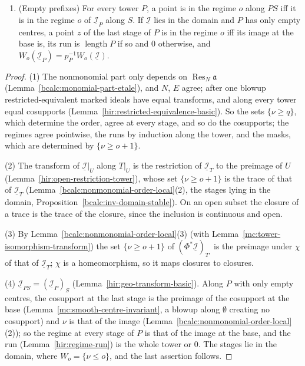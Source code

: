 \begin{lemma}
\begin{enumerate}
biholomorphism \(\Phi\) (Definition~\ref{hir:tower-isomorphism}). Then \(p\in W_o((\Phi^*\underline{\mathcal I})_{T'})\) iff \(\chi(p)\in W_o(\underline{\mathcal I}_T)\).
\item (Empty prefixes) For every tower \(P\), a point is in the regime \(o\) along \(PS\) iff it is in the regime \(o\) of \(\underline{\mathcal I}_P\) along \(S\). If
\(\underline{\mathcal I}\) lies in the domain and \(P\) has only empty centres, a point \(z\) of the last stage of \(P\) is in the regime \(o\) iff its image at the base is,
its run is \(\operatorname{length}P\) if so and \(0\) otherwise, and \(W_o(\underline{\mathcal I}_P)=p_P^{-1}W_o(\underline{\mathcal I})\).
\end{enumerate}
\end{lemma}
\begin{proof}
\leanok
(1) The nonmonomial part only depends on \(\operatorname{Res}_N\mathfrak a\) (Lemma~\ref{bcalc:monomial-part-etale}), and \(N\), \(E\) agree; after one blowup restricted-equivalent
marked ideals have equal transforms, and along every tower equal cosupports (Lemma~\ref{hir:restricted-equivalence-basic}). So the sets \(\{\nu\ge q\}\), which
determine the order, agree at every stage, and so do the cosupports; the regimes agree pointwise, the runs by induction along the tower, and the masks, which
are determined by \(\{\nu\ge o+1\}\).

(2) The transform of \(\underline{\mathcal I}|_U\) along \(T|_U\) is the restriction of \(\underline{\mathcal I}_T\) to the preimage of \(U\) (Lemma~\ref{hir:open-restriction-tower}),
whose set \(\{\nu\ge o+1\}\) is the trace of that of \(\underline{\mathcal I}_T\) (Lemma~\ref{bcalc:nonmonomial-order-local}(2), the stages lying in the domain,
Proposition~\ref{bcalc:inv-domain-stable}). On an open subset the closure of a trace is the trace of the closure, since the inclusion is continuous and open.

(3) By Lemma~\ref{bcalc:nonmonomial-order-local}(3) (with Lemma~\ref{mc:tower-isomorphism-transform}) the set \(\{\nu\ge o+1\}\) of \((\Phi^*\underline{\mathcal I})_{T'}\) is the
preimage under \(\chi\) of that of \(\underline{\mathcal I}_T\); \(\chi\) is a homeomorphism, so it maps closures to closures.

(4) \(\underline{\mathcal I}_{PS}=(\underline{\mathcal I}_P)_S\) (Lemma~\ref{hir:geo-transform-basic}). Along \(P\) with only empty centres, the cosupport at the last stage is the
preimage of the cosupport at the base (Lemma~\ref{mc:smooth-centre-invariant}, a blowup along \(\emptyset\) creating no cosupport) and \(\nu\) is that of the image
(Lemma~\ref{bcalc:nonmonomial-order-local}(2)); so the regime at every stage of \(P\) is that of the image at the base, and the run (Lemma~\ref{hir:regime-run}) is the
whole tower or \(0\). The stages lie in the domain, where \(W_o=\{\nu\le o\}\), and the last assertion follows.
\end{proof}

